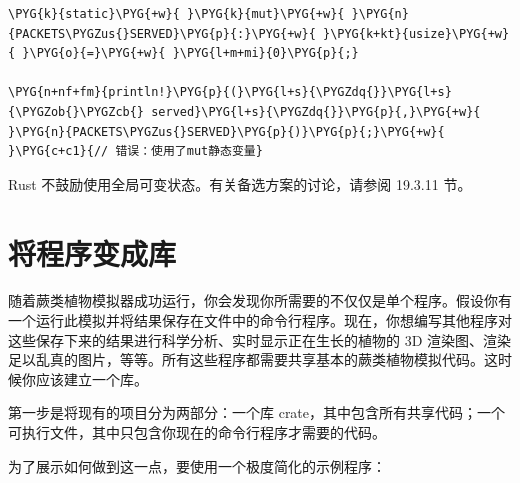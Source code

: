 \begin{Verbatim}[commandchars=\\\{\},breaklines=true,breakanywhere=true,fontsize=\codefont,xleftmargin=17bp]
\PYG{k}{static}\PYG{+w}{ }\PYG{k}{mut}\PYG{+w}{ }\PYG{n}{PACKETS\PYGZus{}SERVED}\PYG{p}{:}\PYG{+w}{ }\PYG{k+kt}{usize}\PYG{+w}{ }\PYG{o}{=}\PYG{+w}{ }\PYG{l+m+mi}{0}\PYG{p}{;}

\PYG{n+nf+fm}{println!}\PYG{p}{(}\PYG{l+s}{\PYGZdq{}}\PYG{l+s}{\PYGZob{}\PYGZcb{} served}\PYG{l+s}{\PYGZdq{}}\PYG{p}{,}\PYG{+w}{ }\PYG{n}{PACKETS\PYGZus{}SERVED}\PYG{p}{)}\PYG{p}{;}\PYG{+w}{  }\PYG{c+c1}{// 错误：使用了mut静态变量}
\end{Verbatim}

Rust 不鼓励使用全局可变状态。有关备选方案的讨论，请参阅 19.3.11 节。

\section{将程序变成库}

随着蕨类植物模拟器成功运行，你会发现你所需要的不仅仅是单个程序。假设你有一个运行此模拟并将结果保存在文件中的命令行程序。现在，你想编写其他程序对这些保存下来的结果进行科学分析、实时显示正在生长的植物的 3D 渲染图、渲染足以乱真的图片，等等。所有这些程序都需要共享基本的蕨类植物模拟代码。这时候你应该建立一个库。

第一步是将现有的项目分为两部分：一个库 crate，其中包含所有共享代码；一个可执行文件，其中只包含你现在的命令行程序才需要的代码。

为了展示如何做到这一点，要使用一个极度简化的示例程序：

